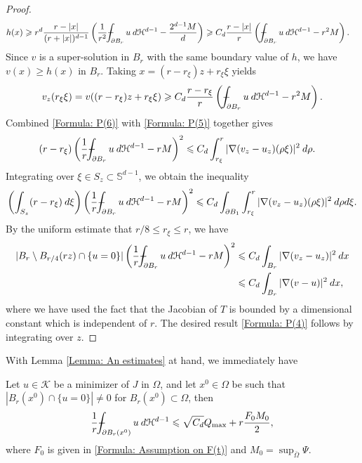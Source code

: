 \documentclass[11pt,reqno]{amsart}
\begin{document}
\begin{proof}
\begin{align*}
    	h(x)&\geqslant  r^{d}\frac{r-|x|}{(r+|x|)^{d-1}}\left(\frac{1}{r^{2}}\dashint_{\partial B_{r}}u\:d\mathcal{H}^{d-1}-\frac{2^{d-1}M}{d}\right)\geqslant C_{d}\frac{r-|x|}{r}\left(\dashint_{\partial B_{r}}u\:d\mathcal{H}^{d-1}-r^{2}M\right).
    \end{align*}
    Since $v$ is a super-solution in $B_{r}$ with the same boundary value of $h$, we have $v(x)\geqslant h(x)$ in $B_{r}$. Taking $x=(r-r_{\xi})z+r_{\xi}\xi$ yields
    \begin{align}\label{Formula: P(6)}
    	v_{z}(r_{\xi}\xi)=v((r-r_{\xi})z+r_{\xi}\xi)\geqslant C_{d}
    	\frac{r-r_{\xi}}{r}\left(\dashint_{\partial B_{r}}u\:d\mathcal{H}^{d-1}-r^{2}M\right).
    \end{align}
    Combined \eqref{Formula: P(6)} with \eqref{Formula: P(5)} together gives
    \begin{align*}
    	(r-r_{\xi})\left(\frac{1}{r}\dashint_{\partial B_{r}}u\:d\mathcal{H}^{d-1}-rM\right)^{2}&\leqslant C_{d}\int_{r_{\xi}}^{r}|\nabla(v_{z}-u_{z})(\rho\xi)|^{2}\:d\rho.
    \end{align*}
    Integrating over $\xi\in S_{z}\subset\mathbb{S}^{d-1}$, we obtain the inequality
    \begin{align*}
    	\left(\int_{S_{z}}(r-r_{\xi})\:d\xi\right)\left(\frac{1}{r}\dashint_{\partial B_{r}}u\:d\mathcal{H}^{d-1}-rM\right)^{2}\leqslant C_{d}\int_{\partial B_{1}}\int_{r_{\xi}}^{r}|\nabla(v_{z}-u_{z})(\rho\xi)|^{2}\:d\rho d\xi.
    \end{align*}
    By the uniform estimate that $r/8\leqslant r_{\xi}\leqslant r$, we have
    \begin{align*}
    	|B_{r}\setminus B_{r/4}(rz)\cap\{u=0\}|\left(\frac{1}{r}\dashint_{\partial B_{r}}u\:d\mathcal{H}^{d-1}-rM\right)^{2}&\leqslant C_{d}\int_{B_{r}}|\nabla(v_{z}-u_{z})|^{2}\:dx\\ 
    	&\leqslant C_{d}\int_{B_{r}}|\nabla(v-u)|^{2}\:dx,
    \end{align*}
    where we have used the fact that the Jacobian of $T$ is bounded by a dimensional constant which is independent of $r$. The desired result \eqref{Formula: P(4)} follows by integrating over $z$.
\end{proof}
With Lemma \ref{Lemma: An estimates} at hand, we immediately have
\begin{proposition}\label{Proposition: Optimal linear growth}
	Let $u\in\mathcal{K}$ be a minimizer of $J$ in $\Omega$, and let $x^{0}\in\Omega$ be such that $|B_{r}(x^{0})\cap\{u=0\}|\neq0$ for $B_{r}(x^{0})\subset\Omega$, then
	\begin{align}\label{Formula: P(7)}
		\frac{1}{r}\dashint_{\partial B_{r}(x^{0})}u\:d\mathcal{H}^{d-1}\leqslant\sqrt{C_{d}}Q_{\mathrm{max}}+r\frac{F_{0}M_{0}}{2},
	\end{align}
	where $F_{0}$ is given in \eqref{Formula: Assumption on F(t)} and $M_{0}=\sup_{\bar{\Omega}}\Psi$.
\end{proposition}
\end{document}
